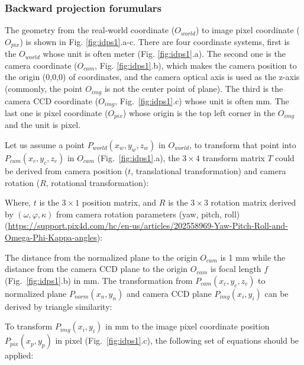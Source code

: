 

\subsubsection{Backward projection forumulars}

The geometry from the real-world coordinate ($O_{world}$) to image pixel coordinate ($O_{pix}$) is shown in Fig. \ref{fig:idps1}.a-c. There are four coordinate systems, first is the $O_{world}$ whose unit is often meter (Fig. \ref{fig:idps1}.a). The second one is the camera coordinate ($O_{cam}$, Fig. \ref{fig:idps1}.b), which makes the camera position to the origin (0,0,0) of coordinates, and the camera optical axis is used as the z-axis (commonly, the point $O_{img}$ is not the center point of plane). The third is the camera CCD coordinate ($O_{img}$, Fig.~\ref{fig:idps1}.c) whose unit is often mm. The last one is pixel coordinate ($O_{pix}$) whose origin is the top left corner in the $O_{img}$ and the unit is pixel.

Let us assume a point $P_{world} (x_w,y_w,z_w)$ in $O_{world}$, to transform that point into $P_{cam} (x_c,y_c,z_c)$ in $O_{cam}$ (Fig.~\ref{fig:idps1}.a), the $3\times4$ transform matrix $T$ could be derived from camera position ($t$, translational transformation) and camera rotation ($R$, rotational transformation):



\noindent 
Where, $t$ is the $3\times1$ position matrix, and $R$ is the $3\times3$ rotation matrix derived by $(\omega, \varphi, \kappa)$ from camera rotation parameters (yaw, pitch, roll) (\url{https://support.pix4d.com/hc/en-us/articles/202558969-Yaw-Pitch-Roll-and-Omega-Phi-Kappa-angles}):

% 

The distance from the normalized plane to the origin $O_{cam}$  is 1 mm while the distance from the camera CCD plane to the origin $O_{cam}$ is focal length $f$ (Fig.~\ref{fig:idps1}.b) in mm. The transformation from $P_{cam}(x_c,y_c,z_c)$ to normalized plane $P_{norm} (x_n,y_n)$ and camera CCD plane $P_{img} (x_i,y_i)$ can be derived by triangle similarity:



To transform $P_{img} (x_i,y_i)$ in mm to the image pixel coordinate position $P_{pix} (x_p,y_p)$ in pixel (Fig.~\ref{fig:idps1}.c), the following set of equations should be applied:

